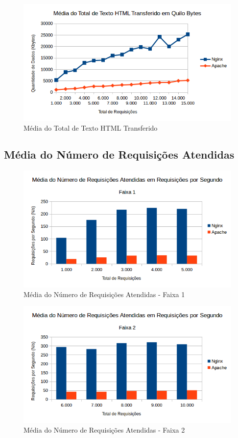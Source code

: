 \begin{figure}[H]
	\centering
	\includegraphics[width=1\linewidth]{graficos/grafico3} 
	\caption{Média do Total de Texto HTML Transferido}
	\label{fig:grafico3}
\end{figure}

\subsection{Média do Número de Requisições Atendidas}
\begin{figure}[H]
	\centering
	\includegraphics[width=1\linewidth]{graficos/grafico4-f1} 
	\caption{Média do Número de Requisições Atendidas - Faixa 1}
	\label{fig:grafico4-f1}
\end{figure}

\begin{figure}[H]
	\centering
	\includegraphics[width=1\linewidth]{graficos/grafico4-f2} 
	\caption{Média do Número de Requisições Atendidas - Faixa 2}
	\label{fig:grafico4-f2}
\end{figure}

